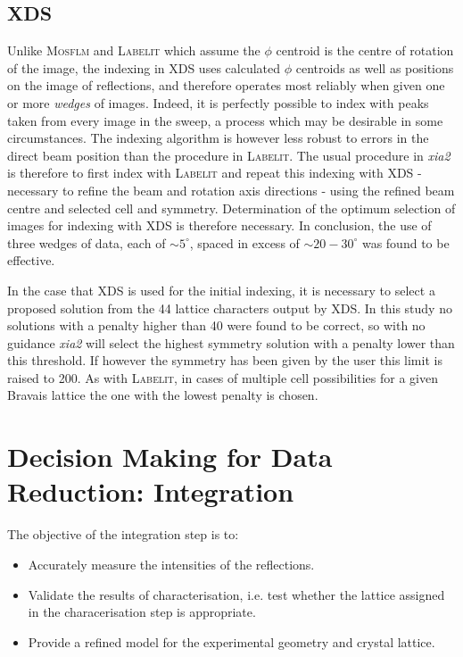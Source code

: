 \documentclass[preprint,pdf]{iucr}
\begin{document}
\subsection{XDS}

Unlike \textsc{Mosflm} and \textsc{Labelit} which assume the $\phi$
centroid is the centre of rotation of the image, 
the indexing in XDS uses calculated $\phi$
centroids as well as positions on the image of reflections, and
therefore operates most reliably when given one or more \emph{wedges} of
images. Indeed, it is perfectly possible to index with peaks taken
from every image in the sweep, a process which may be desirable in some
circumstances. The indexing algorithm is however less robust to
errors in the direct beam position than the procedure in
\textsc{Labelit}. The usual procedure in \emph{xia2} is therefore to first
index with \textsc{Labelit} and repeat this indexing with XDS
 - necessary to refine the beam and rotation axis directions - 
using the refined beam centre and selected cell and symmetry. 
Determination of the optimum selection of images for indexing with XDS
is therefore necessary. In conclusion, the use of three wedges of
data, each of $\sim 5^{\circ}$, spaced in excess of $\sim 20 -
30^{\circ}$ was found to be effective.

In the case that XDS is used for the initial indexing, it is necessary
to select a proposed solution from the 44 lattice characters output by
XDS. In this study no solutions with a penalty higher than 40 were
found to be correct, so with no guidance \emph{xia2} will select the
highest symmetry solution with a penalty lower than this threshold. If
however the symmetry has been given by the user this limit is raised
to 200. As with \textsc{Labelit}, in cases of multiple cell possibilities for a
given Bravais lattice the one with the lowest penalty is chosen.

\section{Decision Making for Data Reduction: Integration}

The objective of the integration step is to:

\begin{itemize}
\item{Accurately measure the intensities of the reflections.}
\item{Validate the results of characterisation, i.e. test whether the
    lattice assigned in the characerisation step is appropriate.}
\item{Provide a refined model for the experimental geometry and
    crystal lattice.}
\end{itemize}
\end{document}
